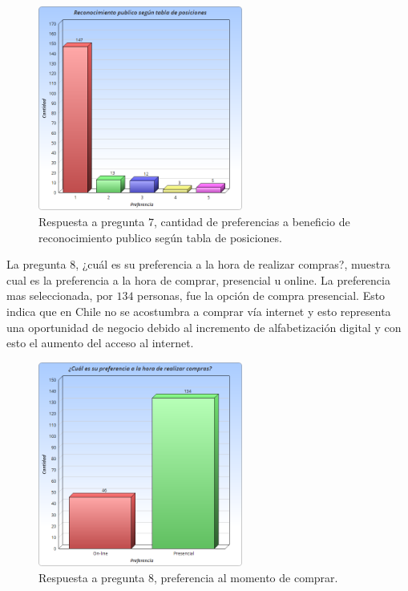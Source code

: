 \begin{figure}[!htb]
  \centering
  \includegraphics[width=0.6\textwidth]{images/Graficos/graf_5_8.png}
  \caption[chart5.8]{Respuesta a pregunta $7$, cantidad de preferencias a beneficio de reconocimiento
publico según tabla de posiciones.}
  \label{fig:chart5.8}
\end{figure}


La pregunta $8$, ¿cuál es su preferencia a la hora de realizar compras?, muestra cual es la preferencia
a la hora de comprar, presencial u online. La preferencia mas seleccionada, por $134$ personas,
fue la opción de compra presencial. Esto indica que en Chile no se acostumbra a comprar vía internet
y esto representa una oportunidad de negocio debido al incremento de alfabetización digital y
con esto el aumento del acceso al internet.

\begin{figure}[!htb]
  \centering
  \includegraphics[width=0.6\textwidth]{images/Graficos/graf_5_9.png}
  \caption[chart5.9]{Respuesta a pregunta $8$, preferencia al momento de comprar.}
  \label{fig:chart5.9}
\end{figure}

